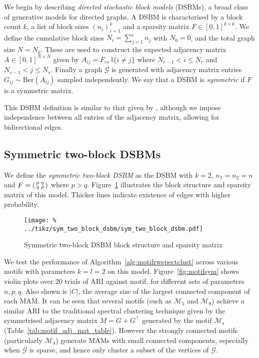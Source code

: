 \documentclass[12pt]{ociamthesis}
\theoremstyle{plain}
\theoremstyle{definition}
\theoremstyle{remark}
\newcommand\bb[1]{\mathbb{#1}}
\newcommand\ca[1]{\mathcal{#1}}
\begin{document}
We begin by describing \emph{directed stochastic block models} (DSBMs), a broad
class of generative models for directed graphs. A DSBM is characterised by a
block count $k$, a list of block sizes $(n_i)_{i=1}^k$ and a sparsity matrix $F
\in [0,1]^{k \times k}$. We define the cumulative block sizes $N_i =
\sum_{j=1}^i n_j$ with $N_0=0$, and the total graph size $N=N_k$. These are
used to construct the expected adjacency matrix $A \in [0,1]^{N \times N}$
given by $A_{i j} = F_{rs} \ \bb{I}\{i \neq j\}$ where $N_{r-1} < i \leq N_r$
and $N_{s-1} < j \leq N_s$. Finally a graph $\ca{G}$ is generated with
adjacency matrix entries $G_{i j} \sim \textrm{Ber}(A_{i j})$ sampled
independently. We say that a DSBM is \emph{symmetric} if $F$ is a symmetric
matrix.

This DSBM definition is similar to that given by \cite{DirectedClustImbCuts},
although we impose independence between all entries of the adjacency matrix,
allowing for bidirectional edges.

\subsection{Symmetric two-block DSBMs}

We define the \emph{symmetric two-block DSBM} as the DSBM with $k=2$,
$n_1=n_2=n$ and
$F =
\begin{psmallmatrix}
  p & q \\ q & p
\end{psmallmatrix}$
where $p > q$. Figure~\ref{fig:sym_two_block_dsbm} illustrates the block
structure and sparsity matrix of this model. Thicker lines indicate existence
of edges with higher probability.

\begin{figure}[H]
  \centering
  \texttt{[image: \%
  ../tikz/sym\_two\_block\_dsbm/sym\_two\_block\_dsbm.pdf]}
  \caption{Symmetric two-block DSBM block structure and sparsity matrix}
  \label{fig:sym_two_block_dsbm}
\end{figure}

We test the performance of Algorithm~\ref{alg:motifrwspectclust} across various
motifs with parameters $k=l=2$ on this model.
Figure~\ref{fig:motifsym} shows violin plots over 20 trials of ARI against
motif, for different sets of parameters $n,p,q$.
Also shown is $|C|$, the average size of the largest connected component of
each MAM.
It can be seen that several motifs (such as $\ca{M}_5$ and $\ca{M}_9$) achieve
a similar ARI to the traditional spectral clustering technique given by the
symmetrised adjacency matrix $M=G+G^\top$ generated by the motif
$\ca{M}_\mathrm{s}$ (Table~\ref{tab:motif_adj_mat_table}).
However the strongly connected motifs (particularly $\ca{M}_4$) generate MAMs
with small connected components, especially when $\ca{G}$ is sparse, and hence
only cluster a subset of the vertices of $\ca{G}$.
\end{document}
